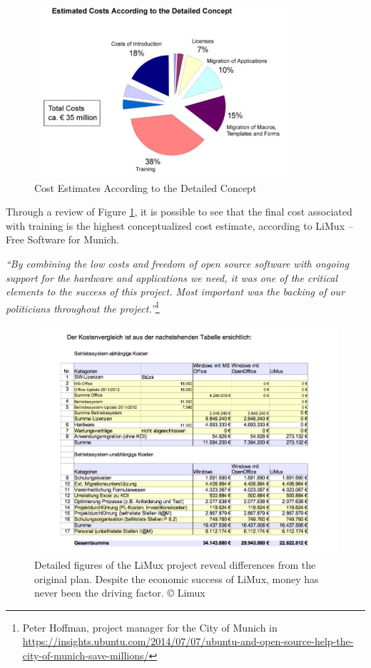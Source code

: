  \begin{figure}
 \centering
     \includegraphics[width=0.86\textwidth]{img/cost_limux_estimates.png}
   \caption  [Limux cost estimates]{Cost Estimates According to the Detailed Concept \protect\footnotemark}  
   \label{fig:cost_limux_estimates}
 \end{figure}

Through a review of Figure \ref{fig:cost_limux_estimates}, it is possible to see that the final cost associated with training is the highest conceptualized cost estimate, according to LiMux – Free Software for Munich. 

\textit{``By combining the low costs and freedom of open source software with ongoing support for the hardware and applications we need, it was one of the critical elements to the success of this project. Most important was the backing of our politicians throughout the project.''}\footnote{Peter Hoffman, project manager for the City of Munich in \url{https://insights.ubuntu.com/2014/07/07/ubuntu-and-open-source-help-the-city-of-munich-save-millions/}}

\begin{figure}
\centering
    \includegraphics[scale=0.55]{img/limuxcost.png}
  \caption [Limux detailed cost]{Detailed figures of the LiMux project reveal differences from the original plan. Despite the economic success of LiMux, money has never been the driving factor. © Limux } 
\end{figure}
